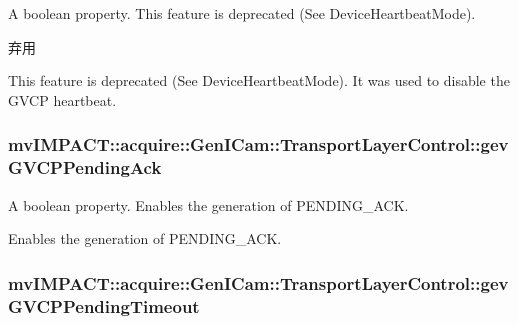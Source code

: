 A boolean property. This feature is deprecated (See Device\+Heartbeat\+Mode). 

\begin{DoxyRefDesc}{弃用}
\item[\hyperlink{deprecated__deprecated000082}{弃用}]This feature is deprecated (See Device\+Heartbeat\+Mode). It was used to disable the G\+V\+C\+P heartbeat. \end{DoxyRefDesc}
\hypertarget{classmv_i_m_p_a_c_t_1_1acquire_1_1_gen_i_cam_1_1_transport_layer_control_aab7a933037c24f38beb987d559c9d9d4}{
\subsubsection[{gev\+G\+V\+C\+P\+Pending\+Ack}]{ mv\+I\+M\+P\+A\+C\+T\+::acquire\+::\+Gen\+I\+Cam\+::\+Transport\+Layer\+Control\+::gev\+G\+V\+C\+P\+Pending\+Ack}}\label{classmv_i_m_p_a_c_t_1_1acquire_1_1_gen_i_cam_1_1_transport_layer_control_aab7a933037c24f38beb987d559c9d9d4}


A boolean property. Enables the generation of P\+E\+N\+D\+I\+N\+G\+\_\+\+A\+C\+K. 

Enables the generation of P\+E\+N\+D\+I\+N\+G\+\_\+\+A\+C\+K. \hypertarget{classmv_i_m_p_a_c_t_1_1acquire_1_1_gen_i_cam_1_1_transport_layer_control_ac88bedde6797258a11f608d2123b02fa}{
\subsubsection[{gev\+G\+V\+C\+P\+Pending\+Timeout}]{ mv\+I\+M\+P\+A\+C\+T\+::acquire\+::\+Gen\+I\+Cam\+::\+Transport\+Layer\+Control\+::gev\+G\+V\+C\+P\+Pending\+Timeout}}\label{classmv_i_m_p_a_c_t_1_1acquire_1_1_gen_i_cam_1_1_transport_layer_control_ac88bedde6797258a11f608d2123b02fa}


